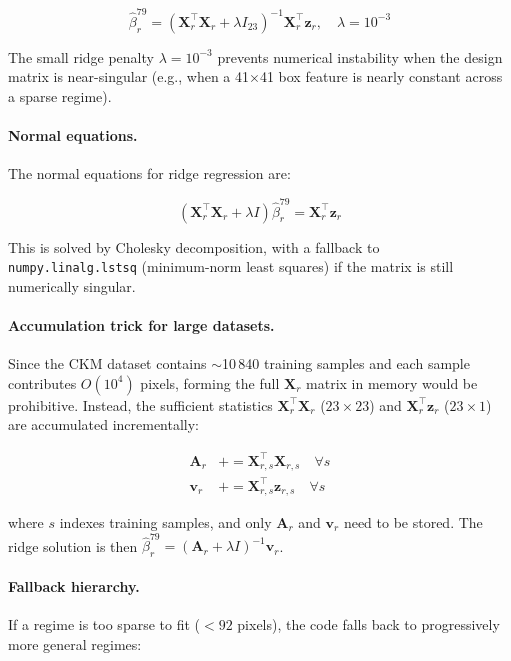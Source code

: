 \documentclass[11pt,a4paper]{article}
\begin{document}
\begin{equation}
\hat\beta^{79}_{r}
=
\left(\mathbf{X}_r^\top \mathbf{X}_r + \lambda I_{23}\right)^{-1}
\mathbf{X}_r^\top \mathbf{z}_r,
\quad \lambda = 10^{-3}
\label{eq:ridge}
\end{equation}

The small ridge penalty $\lambda = 10^{-3}$ prevents numerical instability
when the design matrix is near-singular (e.g., when a 41$\times$41 box
feature is nearly constant across a sparse regime).

\paragraph{Normal equations.}
The normal equations for ridge regression are:

\begin{equation}
\left(\mathbf{X}_r^\top \mathbf{X}_r + \lambda I\right)
\hat\beta^{79}_{r}
=
\mathbf{X}_r^\top \mathbf{z}_r
\label{eq:normal_eqs}
\end{equation}

This is solved by Cholesky decomposition, with a fallback to
\texttt{numpy.linalg.lstsq} (minimum-norm least squares) if the matrix is
still numerically singular.

\paragraph{Accumulation trick for large datasets.}
Since the CKM dataset contains $\sim$10\,840 training samples and each sample
contributes $O(10^4)$ pixels, forming the full $\mathbf{X}_r$ matrix in
memory would be prohibitive. Instead, the sufficient statistics
$\mathbf{X}_r^\top\mathbf{X}_r$ ($23\times 23$) and $\mathbf{X}_r^\top
\mathbf{z}_r$ ($23\times 1$) are accumulated incrementally:

\begin{align}
\mathbf{A}_r &\mathrel{+}= \mathbf{X}_{r,s}^\top \mathbf{X}_{r,s} \quad \forall s\\
\mathbf{v}_r &\mathrel{+}= \mathbf{X}_{r,s}^\top \mathbf{z}_{r,s} \quad \forall s
\end{align}

where $s$ indexes training samples, and only $\mathbf{A}_r$ and $\mathbf{v}_r$
need to be stored. The ridge solution is then $\hat\beta^{79}_{r} = (\mathbf{A}_r
+ \lambda I)^{-1} \mathbf{v}_r$.

\paragraph{Fallback hierarchy.}
If a regime is too sparse to fit ($< 92$ pixels), the code falls back to
progressively more general regimes:
\end{document}
